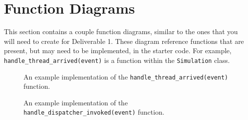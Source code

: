 \documentclass[main.tex]{subfiles}
\begin{document}
\section{Function Diagrams}

This section contains a couple function diagrams, similar to the ones that you will need to create for Deliverable 1. These diagram reference functions that are present, but may need to be implemented, in the starter code. For example, \texttt{handle\_thread\_arrived(event)} is a function within the \texttt{Simulation} class.

\begin{figure}[h]
    \centering
    
    \caption{An example implementation of the \texttt{handle\_thread\_arrived(event)} function.}
    \label{fig:thread-arr}
\end{figure}

\begin{figure}[h]
    \centering
    
    \caption{An example implementation of the \texttt{handle\_dispatcher\_invoked(event)} function.}
    \label{fig:disp-invoked}
\end{figure}
\end{document}
